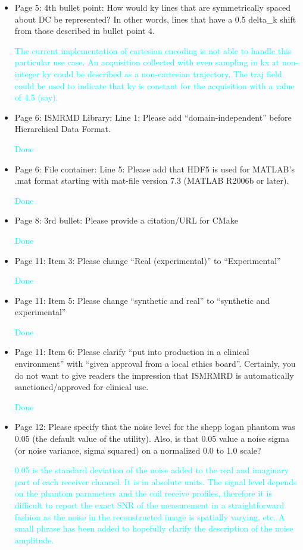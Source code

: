 \documentclass[12pt, draft]{article}
\makeatletter
\def\namedlabel#1#2{\begingroup#2\def\@currentlabel{#2}\phantomsection\label{#1}\endgroup}
\newcommand{\question}[1]{\item[\namedlabel{q#1}{#1}]}
\newcommand{\response}[1]{\textcolor{cyan}{#1}}
\makeatother
\begin{document}
{\begin{itemize}
\response{Done}

\question{R2.17} Page 5: 4th bullet point: How would ky lines that are symmetrically spaced about DC be represented? In other words, lines that have a 0.5 delta\_k shift from those described in bullet point 4.

\response{The current implementation of cartesian encoding is not able to handle this particular use case.  An acquisition collected with even sampling in kx at non-integer ky could be described as a non-cartesian trajectory.  The traj field could be used to indicate that ky is constant for the acquisition with a value of 4.5 (say).}

\question{R2.18} Page 6: ISMRMD Library: Line 1: Please add ``domain-independent'' before Hierarchical Data Format.

\response{Done}

\question{R2.19} Page 6: File container: Line 5: Please add that HDF5 is used for MATLAB's .mat format starting with mat-file version 7.3 (MATLAB R2006b or later).

\response{Done}

\question{R2.20} Page 8: 3rd bullet: Please provide a citation/URL for CMake

\response{Done}

\question{R2.21} Page 11: Item 3: Please change ``Real (experimental)'' to ``Experimental''

\response{Done}

\question{R2.22} Page 11: Item 5: Please change ``synthetic and real'' to ``synthetic and experimental''

\response{Done}

\question{R2.23} Page 11: Item 6: Please clarify ``put into production in a clinical environment'' with ``given approval from a local ethics board''. Certainly, you do not want to give readers the impression that ISMRMRD is automatically sanctioned/approved for clinical use.

\response{Done}

\question{R2.24} Page 12: Please specify that the noise level for the shepp logan phantom was 0.05 (the default value of the utility). Also, is that 0.05 value a noise sigma (or noise variance, sigma squared) on a normalized 0.0 to 1.0 scale?

\response{0.05 is the standard deviation of the noise added to the real and imaginary part of each receiver channel.  It is in absolute units.  The signal level depends on the phantom parameters and the coil receive profiles, therefore it is difficult to report the exact SNR of the measurement in a straightforward fashion as the noise in the reconstructed image is spatially varying, etc.  A small phrase has been added to hopefully clarify the description of the noise amplitude.}


\end{itemize}}
\end{document}
